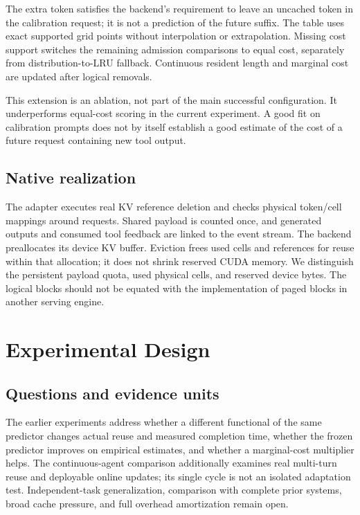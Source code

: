 \documentclass[sigconf, screen, review, balance=false]{acmart}
\begin{document}
The extra token satisfies the backend's requirement to leave an uncached
token in the calibration request; it is not a prediction of the future
suffix. The table uses exact supported grid points without interpolation
or extrapolation. Missing cost support switches the remaining admission
comparisons to equal cost, separately from distribution-to-LRU fallback.
Continuous resident length and marginal cost are updated after logical
removals.

This extension is an ablation, not part of the main successful
configuration. It underperforms equal-cost scoring in the current
experiment. A good fit on calibration prompts does not by itself
establish a good estimate of the cost of a future request containing new
tool output.

\subsection{Native realization}\label{native-realization}

The adapter executes real KV reference deletion and checks physical
token/cell mappings around requests. Shared payload is counted once, and
generated outputs and consumed tool feedback are linked to the event
stream. The backend preallocates its device KV buffer. Eviction frees
used cells and references for reuse within that allocation; it does not
shrink reserved CUDA memory. We distinguish the persistent payload
quota, used physical cells, and reserved device bytes. The logical
blocks should not be equated with the implementation of paged blocks in
another serving engine.

\section{Experimental Design}\label{experimental-design}

\subsection{Questions and evidence
units}\label{questions-and-evidence-units}

The earlier experiments address whether a different functional of the
same predictor changes actual reuse and measured completion time,
whether the frozen predictor improves on empirical estimates, and
whether a marginal-cost multiplier helps. The continuous-agent
comparison additionally examines real multi-turn reuse and deployable
online updates; its single cycle is not an isolated adaptation test. Independent-task
generalization, comparison with complete prior systems, broad cache
pressure, and full overhead amortization remain open.
\end{document}
